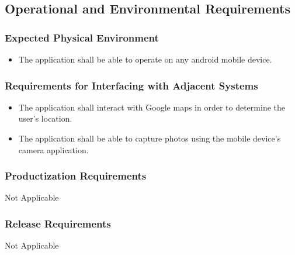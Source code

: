\documentclass[]{article}
\begin{document}

\subsection{Operational and Environmental Requirements}
\label{sub:operational_and_environmental_requirements}

\subsubsection{Expected Physical Environment}
\label{ssub:expected_physical_environment}
\begin{itemize}
	\item The application shall be able to operate on any android mobile device.
\end{itemize}


\subsubsection{Requirements for Interfacing with Adjacent Systems}
\label{ssub:requirements_for_interfacing_with_adjacent_systems}
\begin{itemize}
	\item The application shall interact with Google maps in order to determine the user's location.
	\item The application shall be able to capture photos using the mobile device's camera application.
\end{itemize}

\subsubsection{Productization Requirements}
\label{ssub:productization_requirements}
Not Applicable

\subsubsection{Release Requirements}
\label{ssub:release_requirements}
	Not Applicable
\end{document}
